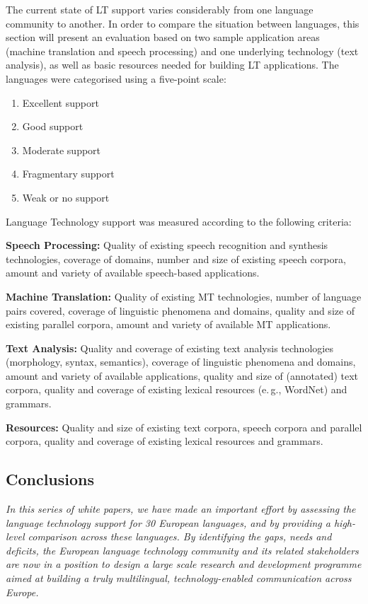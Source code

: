 \begin{multicols}{2}
  The current state of LT support varies considerably from one language community to another. In order to compare the situation between languages, this section will present an evaluation based on two sample application areas (machine translation and speech processing) and one underlying technology (text analysis), as well as basic resources needed for building LT applications. The languages were categorised using a five-point scale: 

  \begin{enumerate}
  \item Excellent support
  \item Good support
  \item Moderate support
  \item Fragmentary support
  \item Weak or no support
  \end{enumerate}

  Language Technology support was measured according to the following criteria:

  \textbf{Speech Processing:} Quality of existing speech recognition and synthesis technologies, coverage of domains, number and size of existing speech corpora, amount and variety of available speech-based applications.

  \textbf{Machine Translation:} Quality of existing MT technologies, number of language pairs covered, coverage of linguistic phenomena and domains, quality and size of existing parallel corpora, amount and variety of available MT applications.

  \textbf{Text Analysis:} Quality and coverage of existing text analysis technologies (morphology, syntax, semantics), coverage of linguistic phenomena and domains, amount and variety of available applications, quality and size of (annotated) text corpora, quality and coverage of existing lexical resources (e.\,g., WordNet) and grammars.

  \textbf{Resources:} Quality and size of existing text corpora, speech corpora and parallel corpora, quality and coverage of existing lexical resources and grammars.

  \subsection{Conclusions}

  \emph{In this series of white papers, we have made an important effort by assessing the language technology support for 30 European languages, and by providing a high-level comparison across these languages. By identifying the gaps, needs and deficits, the European language technology community and its related stakeholders are now in a position to design a large scale research and development programme aimed at building a truly multilingual, technology-enabled communication across Europe.}


\end{multicols}
